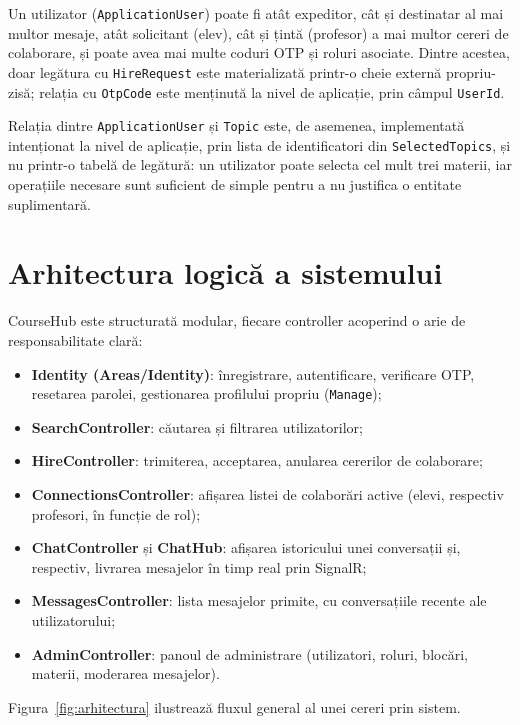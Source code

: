 Un utilizator (\texttt{ApplicationUser}) poate fi atât expeditor, cât și destinatar al
mai multor mesaje, atât solicitant (elev), cât și țintă (profesor) a mai multor cereri
de colaborare, și poate avea mai multe coduri OTP și roluri asociate. Dintre acestea,
doar legătura cu \texttt{HireRequest} este materializată printr-o cheie externă
propriu-zisă; relația cu \texttt{OtpCode} este menținută la nivel de aplicație, prin
câmpul \texttt{UserId}.

Relația dintre \texttt{ApplicationUser} și \texttt{Topic} este, de asemenea, implementată
intenționat la nivel de aplicație, prin lista de identificatori din \texttt{SelectedTopics},
și nu printr-o tabelă de legătură: un utilizator poate selecta cel mult trei materii, iar
operațiile necesare sunt suficient de simple pentru a nu justifica o entitate suplimentară.

\section{Arhitectura logică a sistemului}

CourseHub este structurată modular, fiecare controller acoperind o arie de
responsabilitate clară:

\begin{itemize}
    \item \textbf{Identity (Areas/Identity)}: înregistrare, autentificare, verificare OTP,
    resetarea parolei, gestionarea profilului propriu (\texttt{Manage});
    \item \textbf{SearchController}: căutarea și filtrarea utilizatorilor;
    \item \textbf{HireController}: trimiterea, acceptarea, anularea cererilor de colaborare;
    \item \textbf{ConnectionsController}: afișarea listei de colaborări active (elevi, respectiv
    profesori, în funcție de rol);
    \item \textbf{ChatController} și \textbf{ChatHub}: afișarea istoricului unei conversații
    și, respectiv, livrarea mesajelor în timp real prin SignalR;
    \item \textbf{MessagesController}: lista mesajelor primite, cu conversațiile recente ale utilizatorului;
    \item \textbf{AdminController}: panoul de administrare (utilizatori, roluri, blocări,
    materii, moderarea mesajelor).
\end{itemize}

Figura~\ref{fig:arhitectura} ilustrează fluxul general al unei cereri prin sistem.

